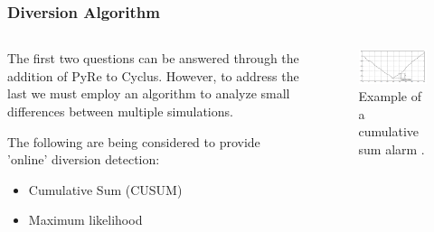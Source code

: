 \begin{frame}
\frametitle{Diversion Algorithm}
\begin{columns}
	\begin{column}{.5\textwidth}
	The first two questions can be answered through the addition of PyRe to Cyclus. However, to address the last we must 
	employ an algorithm to analyze small differences between multiple simulations.

	The following are being considered to provide 'online' diversion detection:
	\begin{itemize}
		\item Cumulative Sum (CUSUM)
		\item Maximum likelihood
	\end{itemize}
	\end{column}
	\begin{column}{.5\textwidth}
		\begin{figure}
		\centering
		\includegraphics[width=\linewidth]{cusum-example}
		\caption{Example of a cumulative sum alarm \cite{basseville_detection_1993}.}
		\label{fig:cusum}
		\end{figure}
	\end{column}
\end{columns} 
\end{frame}
